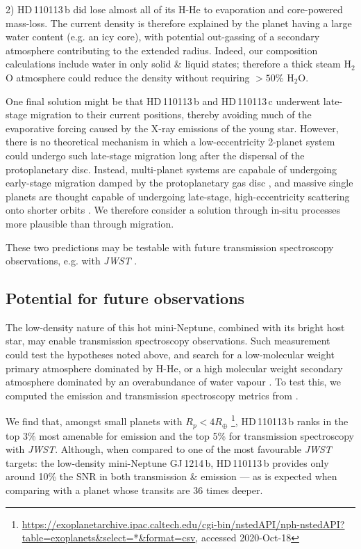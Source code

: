 \documentclass[fleqn,usenatbib]{mnras}
\newcommand{\Tplanet}{HD\,110113\,b}
\newcommand{\Tplanetc}{HD\,110113\,c}
\begin{document}
2) \Tplanet{} did lose almost all of its H-He to evaporation and core-powered mass-loss.
The current density is therefore explained by the planet having a large water content (e.g. an icy core), with potential out-gassing of a secondary atmosphere contributing to the extended radius.
Indeed, our composition calculations include water in only solid \& liquid states; therefore a thick steam \citep[or supercritical;][]{mousis2020irradiated} H$_{2}$O atmosphere could reduce the density without requiring $>50\%$ H$_{2}$O.

One final solution might be that \Tplanet{} and \Tplanetc{} underwent late-stage migration to their current positions, thereby avoiding much of the evaporative forcing caused by the X-ray emissions of the young star. 
However, there is no theoretical mechanism in which a low-eccentricity 2-planet system could undergo such late-stage migration long after the dispersal of the protoplanetary disc.
Instead, multi-planet systems are capabale of undergoing early-stage migration damped by the protoplanetary gas disc \citep{2006A&A...450..833C,2019MNRAS.486.3874C}, and massive single planets are thought capable of undergoing late-stage, high-eccentricity scattering onto shorter orbits \citep{2008ApJ...686..621F,2012ApJ...751..119B}.
We therefore consider a solution through in-situ processes more plausible than through migration.

These two predictions may be testable with future transmission spectroscopy observations, e.g. with \textit{JWST} \citep{2016ApJ...817...17G,2014PASP..126.1134B}.

\subsection{Potential for future observations}\label{sect:future}
The low-density nature of this hot mini-Neptune, combined with its bright host star, may enable transmission spectroscopy observations.
Such measurement could test the hypotheses noted above, and search for a low-molecular weight primary atmosphere dominated by H-He, or a high molecular weight secondary atmosphere dominated by an overabundance of water vapour \citep{2020arXiv201011867B}.
To test this, we computed the emission and transmission spectroscopy metrics from \citet{kempton2018framework}.

We find that, amongst small planets with $R_p<4R_\oplus$ \citep{akeson2013nasa}\footnote{\url{https://exoplanetarchive.ipac.caltech.edu/cgi-bin/nstedAPI/nph-nstedAPI?table=exoplanets&select=*&format=csv}, accessed 2020-Oct-18}, \Tplanet{} ranks in the top 3\% most amenable for emission and the top 5\% for transmission spectroscopy with \textit{JWST}.
Although, when compared to one of the most favourable \textit{JWST} targets: the low-density mini-Neptune GJ\,1214\,b, \Tplanet{} provides only around 10\% the SNR in both transmission \& emission --- as is expected when comparing with a planet whose transits are 36 times deeper.
\end{document}
